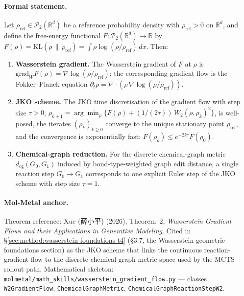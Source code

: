 \paragraph{Formal statement.}
\begin{theorem}[Xue 2026]
\label{thm:T4-w2-gf}
Let $\rho_{\mathrm{ref}} \in \mathcal{P}_2(\mathbb{R}^d)$ be a
reference probability density with $\rho_{\mathrm{ref}} > 0$ on
$\mathbb{R}^d$, and define the free-energy functional
$F : \mathcal{P}_2(\mathbb{R}^d) \to \mathbb{R}$ by
$F(\rho) = \mathrm{KL}(\rho \,\|\, \rho_{\mathrm{ref}}) = \int
\rho \log(\rho / \rho_{\mathrm{ref}}) \, dx$.  Then:
\begin{enumerate}
  \item[(i)] \textbf{Wasserstein gradient.}  The Wasserstein gradient
    of $F$ at $\rho$ is
    $\mathrm{grad}_W F(\rho) = \nabla \log(\rho / \rho_{\mathrm{ref}})$;
    the corresponding gradient flow is the Fokker--Planck equation
    $\partial_t \rho = \nabla \cdot (\rho \, \nabla \log(\rho /
    \rho_{\mathrm{ref}}))$.
  \item[(ii)] \textbf{JKO scheme.}  The JKO time discretisation of
    the gradient flow with step size $\tau > 0$,
    $\rho_{k+1} = \arg\min_{\rho} \{ F(\rho) + (1 / (2\tau)) \,
    W_2(\rho, \rho_k)^2 \}$, is well-posed, the iterates
    $(\rho_k)_{k \geq 0}$ converge to the unique stationary point
    $\rho_{\mathrm{ref}}$, and the convergence is exponentially
    fast: $F(\rho_k) \le e^{-2 k \tau} F(\rho_0)$.
  \item[(iii)] \textbf{Chemical-graph reduction.}  For the discrete
    chemical-graph metric
    $d_{\mathrm{cg}}(G_0, G_1)$ induced by bond-type-weighted graph
    edit distance, a single reaction step
    $G_0 \to G_1$ corresponds to one explicit Euler step of the
    JKO scheme with step size $\tau = 1$.
\end{enumerate}
\end{theorem}

\paragraph{Mol-Metal anchor.}
Theorem reference: Xue (薛小平) (2026), Theorem~2,
\emph{Wasserstein Gradient Flows and their Applications in
Generative Modeling}.  Cited in
\S\ref{sec:method:wasserstein-foundations-t4} (\S3.7, the
Wasserstein-geometric foundations section) as the JKO scheme that
links the continuous reaction-gradient flow to the discrete
chemical-graph metric space used by the MCTS rollout path.
Mathematical skeleton:
\texttt{molmetal/math\_skills/wasserstein\_gradient\_flow.py} ---
classes \texttt{W2GradientFlow}, \texttt{ChemicalGraphMetric},
\texttt{ChemicalGraphReactionStepW2}.

